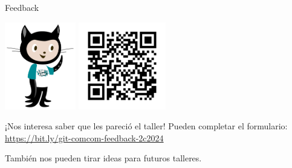 \begin{frame}{Feedback}

    \begin{center}
        \includegraphics[height=1.5in]{images/octocat-comcom.pdf}
        \includegraphics[height=1.5in]{images/feedback-24c2.png}
    \end{center}

    \begin{block}{¡Nos interesa saber que les pareció el taller!}
        Pueden completar el formulario: \url{https://bit.ly/git-comcom-feedback-2c2024}

        \vspace{0.5em}

        También nos pueden tirar ideas para futuros talleres.
    \end{block}

\end{frame}
